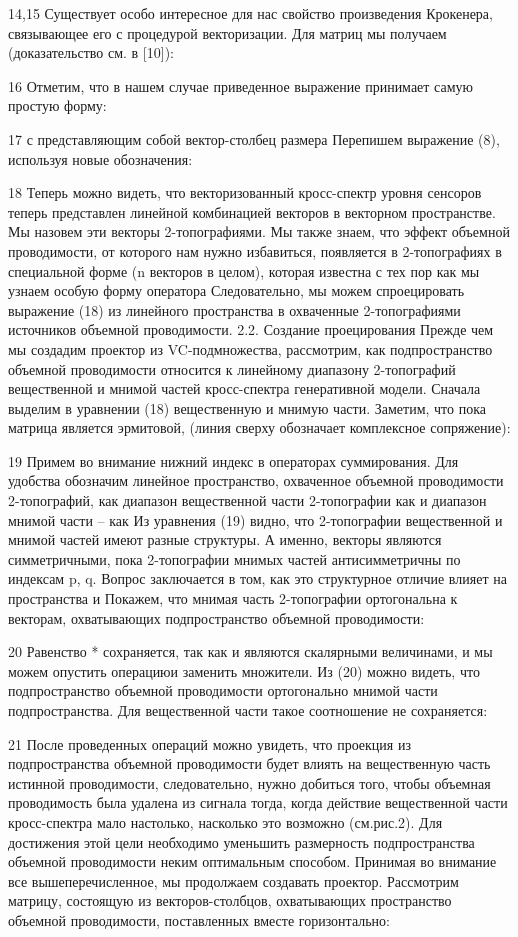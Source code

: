 14,15
Существует особо интересное для нас свойство произведения Крокенера, связывающее его с процедурой векторизации. Для матриц мы получаем (доказательство см. в [10]):

16
Отметим, что в нашем случае приведенное выражение принимает самую простую форму:

17
с представляющим собой вектор-столбец размера 
Перепишем выражение (8), используя новые обозначения:

18
Теперь можно видеть, что векторизованный кросс-спектр уровня сенсоров теперь представлен линейной комбинацией векторов в векторном пространстве. Мы назовем эти векторы 2-топографиями. Мы также знаем, что эффект объемной проводимости, от которого нам нужно избавиться, появляется в 2-топографиях в специальной форме (n векторов в целом), которая известна с тех пор как мы узнаем особую форму оператора Следовательно, мы можем спроецировать выражение (18) из линейного пространства в охваченные 2-топографиями источников объемной проводимости.
2.2. Создание проецирования
Прежде чем мы создадим проектор из VC-подмножества, рассмотрим, как подпространство объемной проводимости относится к линейному диапазону 2-топографий вещественной и мнимой частей кросс-спектра генеративной модели.
Сначала выделим в уравнении (18) вещественную и мнимую части. Заметим, что пока матрица является эрмитовой, (линия сверху обозначает комплексное сопряжение):

19
Примем во внимание нижний индекс в операторах суммирования.
Для удобства обозначим линейное пространство, охваченное объемной проводимости 2-топографий, как диапазон вещественной части 2-топографии как и диапазон мнимой части – как 
Из уравнения (19) видно, что 2-топографии вещественной и мнимой частей имеют разные структуры. А именно, векторы являются симметричными, пока 2-топографии мнимых частей антисимметричны по индексам p, q. Вопрос заключается в том, как это структурное отличие влияет на пространства и Покажем, что мнимая часть 2-топографии ортогональна к векторам, охватывающих подпространство объемной проводимости: 

20
Равенство * сохраняется, так как и являются скалярными величинами, и мы можем опустить операциюи заменить множители. Из (20) можно видеть, что подпространство объемной проводимости ортогонально мнимой части подпространства. Для вещественной части такое соотношение не сохраняется:

21
После проведенных операций можно увидеть, что проекция из подпространства объемной проводимости будет влиять на вещественную часть истинной проводимости, следовательно, нужно добиться того, чтобы объемная проводимость была удалена из сигнала тогда, когда действие вещественной части кросс-спектра мало настолько, насколько это возможно (см.рис.2). Для достижения этой цели необходимо уменьшить размерность подпространства объемной проводимости неким оптимальным способом.
Принимая во внимание все вышеперечисленное, мы продолжаем создавать проектор. Рассмотрим матрицу, состоящую из векторов-столбцов, охватывающих пространство объемной проводимости, поставленных вместе горизонтально:


